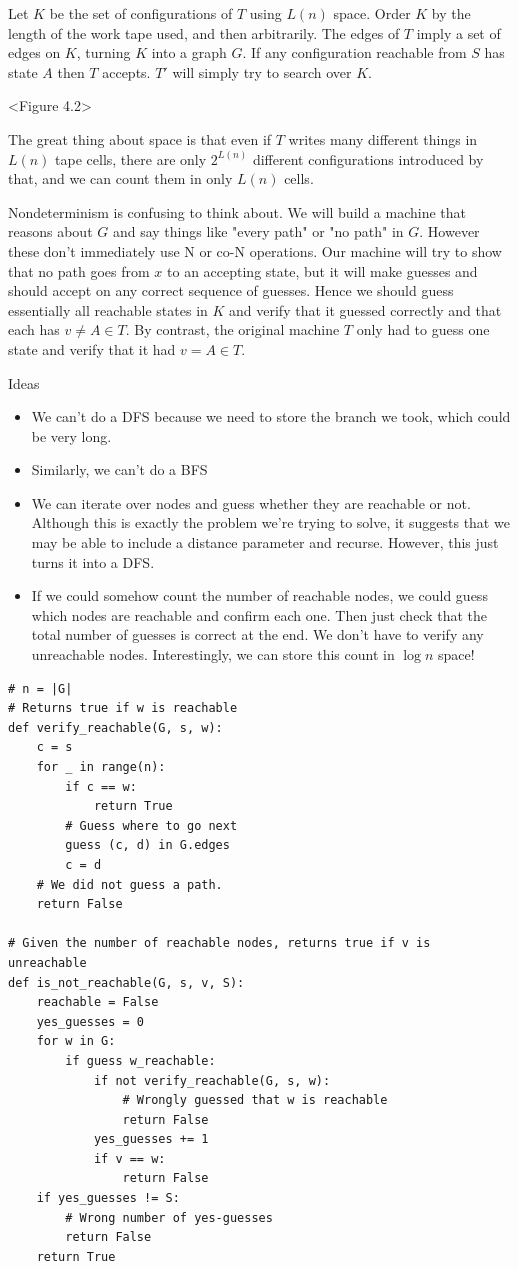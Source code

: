 \documentclass{article}
\theoremstyle{definition}
\theoremstyle{example}
\theoremstyle{plain}
\theoremstyle{plain}
\theoremstyle{definition}
\begin{document}
Let $K$ be the set of configurations of $T$ using $L(n)$ space. Order $K$ by the length of the work tape used, and then arbitrarily. The edges of $T$ imply a set of edges on $K$, turning $K$ into a graph $G$. If any configuration reachable from $S$ has state $A$ then $T$ accepts. $T'$ will simply try to search over $K$.

<Figure 4.2>

The great thing about space is that even if $T$ writes many different things in $L(n)$ tape cells, there are only $2^{L(n)}$ different configurations introduced by that, and we can count them in only $L(n)$ cells.

Nondeterminism is confusing to think about. We will build a machine that reasons about $G$ and say things like "every path" or "no path" in $G$. However these don't immediately use N or co-N operations. Our machine will try to show that no path goes from $x$ to an accepting state, but it will make guesses and should accept on any correct sequence of guesses. Hence we should guess essentially all reachable states in $K$ and verify that it guessed correctly and that each has $v \neq A \in T$. By contrast, the original machine $T$ only had to guess one state and verify that it had $v = A \in T$.

Ideas
\begin{itemize}
\item We can't do a DFS because we need to store the branch we took, which could be very long.
\item Similarly, we can't do a BFS
\item We can iterate over nodes and guess whether they are reachable or not. Although this is exactly the problem we're trying to solve, it suggests that we may be able to include a distance parameter and recurse. However, this just turns it into a DFS.
\item If we could somehow count the number of reachable nodes, we could guess which nodes are reachable and confirm each one. Then just check that the total number of guesses is correct at the end. We don't have to verify any unreachable nodes. Interestingly, we can store this count in $\log n$ space!
\end{itemize}
\begin{lstlisting}
# n = |G|
# Returns true if w is reachable
def verify_reachable(G, s, w):
    c = s
    for _ in range(n):
        if c == w:
            return True
        # Guess where to go next
        guess (c, d) in G.edges
        c = d
    # We did not guess a path.
    return False

# Given the number of reachable nodes, returns true if v is unreachable
def is_not_reachable(G, s, v, S):
    reachable = False
    yes_guesses = 0
    for w in G:
        if guess w_reachable:
            if not verify_reachable(G, s, w):
                # Wrongly guessed that w is reachable
                return False
            yes_guesses += 1
            if v == w:
                return False
    if yes_guesses != S:
        # Wrong number of yes-guesses
        return False
    return True
\end{lstlisting}
\end{document}
